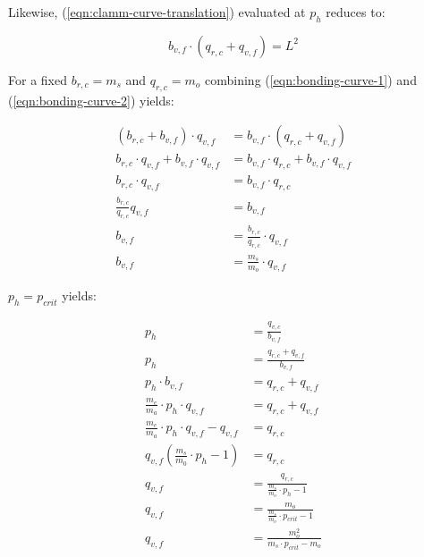 \documentclass[table, twocolumn]{article}
\begin{document}
Likewise, (\ref{eqn:clamm-curve-translation}) evaluated at $p_h$ reduces to:

\begin{equation} \label{eqn:bonding-curve-2}
  b_{v, f} \cdot (q_{r, c} + q_{v, f}) = L^2
\end{equation}

For a fixed $b_{r, c} = m_s$ and $q_{r, c} = m_o$ combining (\ref{eqn:bonding-curve-1})
and (\ref{eqn:bonding-curve-2}) yields:

\begin{align} \label{eqn:bonding-curve-3}
  (b_{r, c} + b_{v, f}) \cdot q_{v, f}              & =
  b_{v, f} \cdot (q_{r, c} + q_{v, f}) \nonumber              \\
  b_{r, c} \cdot q_{v, f} + b_{v, f} \cdot q_{v, f} & =
  b_{v, f} \cdot q_{r, c} + b_{v, f} \cdot q_{v, f} \nonumber \\
  b_{r, c} \cdot q_{v, f}                           & =
  b_{v, f} \cdot q_{r, c} \nonumber                           \\
  \frac{b_{r, c}}{q_{r, c}} q_{v, f}                & =
  b_{v, f} \nonumber                                          \\
  b_{v, f}                                          & =
  \frac{b_{r, c}}{q_{r, c}} \cdot q_{v, f} \nonumber          \\
  b_{v, f}                                          & =
  \frac{m_s}{m_o} \cdot q_{v, f}
\end{align}

$p_h = p_{crit}$ yields:

\begin{align} \label{eqn:bonding-curve-4}
  p_h                                                 & =
  \frac{q_{v, c}}{b_{v, f}} \nonumber                      \\
  p_h                                                 & =
  \frac{q_{r, c} + q_{v, f}}{b_{v, f}} \nonumber           \\
  p_h \cdot b_{v, f}                                  & =
  q_{r, c} + q_{v, f} \nonumber                            \\
  \frac{m_e}{m_a} \cdot p_h \cdot q_{v, f}            & =
  q_{r, c} + q_{v, f} \nonumber                            \\
  \frac{m_e}{m_a} \cdot p_h \cdot q_{v, f} - q_{v, f} & =
  q_{r, c} \nonumber                                       \\
  q_{v, f} (\frac{m_s}{m_0} \cdot p_h - 1)            & =
  q_{r, c} \nonumber                                       \\
  q_{v, f}                                            & =
  \frac{q_{r, c}}{\frac{m_s}{m_o} \cdot p_h - 1} \nonumber \\
  q_{v, f}                                            & =
  \frac{m_o}{\frac{m_s}{m_o} \cdot p_{crit} - 1} \nonumber \\
  q_{v, f}                                            & =
  \frac{m_o ^ 2}{m_s \cdot p_{crit} - m_o}
\end{align}
\end{document}
